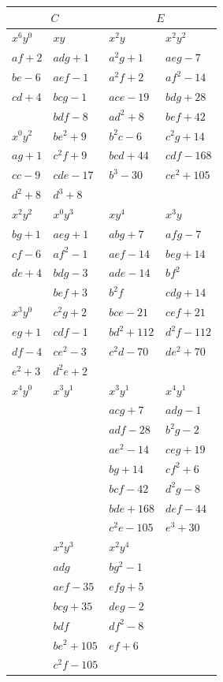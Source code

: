 \documentclass[11pt,a4paper]{article}
\begin{document}
\medskip
\noindent
\begin{tabular}{|l|l|l|l|}
\hline
\multicolumn{2}{|c|}{$C$} & \multicolumn{2}{c|}{$E$}\\
\hline
$x^{6}y^{0}$ & $xy$ & $x^{2}y$ & $x^{2}y^{2}$\\
\hline
$af+2$ & $adg+1$ & $a^{2}g+1$ & $aeg-7$\\
$be-6$ & $aef-1$ & $a^{2}f+2$ & $af^{2}-14$\\
$cd+4$ & $bcg-1$ & $ace-19$ & $bdg+28$\\
        & $bdf-8$ & $ad^{2}+8$ & $bef+42$\\
$x^{0}y^{2}$ & $be^{2}+9$ & $b^{2}c-6$ & $c^{2}g+14$\\
$ag+1$ & $c^{2}f+9$ & $bcd+44$ & $cdf-168$\\
$cc-9$ & $cde-17$ & $b^{3}-30$ & $ce^{2}+105$\\
$d^{2}+8$ & $d^{3}+8$ & & \\
\hline
$x^{2}y^{2}$ & $x^{0}y^{3}$ & $xy^{4}$ & $x^{3}y$\\
\hline
$bg+1$ & $aeg+1$ & $abg+7$ & $afg-7$\\
$cf-6$ & $af^{2}-1$ & $aef-14$ & $beg+14$\\
$de+4$ & $bdg-3$ & $ade-14$ & $bf^{2}$\\
       & $bef+3$ & $b^{2}f$ & $cdg+14$\\
$x^{3}y^{0}$ & $c^{2}g+2$ & $bce-21$ & $cef+21$\\
$eg+1$ & $cdf-1$ & $bd^{2}+112$ & $d^{2}f-112$\\
$df-4$ & $ce^{2}-3$ & $c^{2}d-70$ & $de^{2}+70$\\
$e^{2}+3$ & $d^{2}e+2$ & & \\
\hline
$x^{4}y^{0}$ & $x^{3}y^{1}$ & $x^{3}y^{1}$ & $x^{4}y^{1}$\\
\hline
& & $acg+7$ & $adg-1$\\
& & $adf-28$ & $b^{2}g-2$\\
& & $ae^{2}-14$ & $ceg+19$\\
& & $bg+14$ & $cf^{2}+6$\\
& & $bcf-42$ & $d^{2}g-8$\\
& & $bde+168$ & $def-44$\\
& & $c^{2}e-105$ & $e^{3}+30$\\
\hline
& $x^{2}y^{3}$ & $x^{2}y^{4}$ & \\
\hline
& $adg$ & $bg^{2}-1$ &\\
& $aef-35$ & $efg+5$ &\\
& $bcg+35$ & $deg-2$ &\\
& $bdf$ & $df^{2}-8$ &\\
& $be^{2}+105$ & $ef+6$ &\\
& $c^{2}f-105$ & & \\
\hline
\end{tabular}
\end{document}
